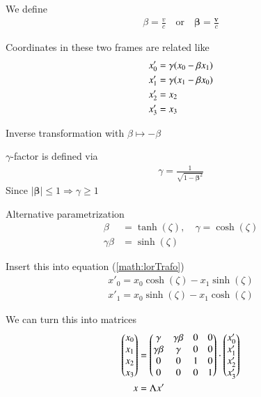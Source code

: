 We define
\begin{align}
   \beta = \frac{v}{c} \quad \text{or} \quad
   \pmb{\beta} = \frac{\pmb{v}}{c}
\end{align}

Coordinates in these two frames are related like
\begin{align*}
   x'_0 &= \gamma(x_0 - \beta x_1) \\
   x'_1 &= \gamma (x_1 - \beta x_0) \notag \\
   x'_2 &= x_2 \notag \\
   x'_3 &= x_3 \notag \label{math:lorTrafo}
\end{align*}

Inverse transformation with $\beta \mapsto -\beta$

$\gamma$-factor is defined via
\begin{align}
   \gamma = \frac{1}{\sqrt{1-\pmb{\beta}^2}}
\end{align}
Since $|\pmb{\beta}| \leq 1 \Rightarrow \gamma \geq 1$

Alternative parametrization
\begin{align*}
   \beta &= \tanh(\zeta), \quad \gamma = \cosh(\zeta) \\
   \gamma \beta &= \sinh(\zeta)
\end{align*}

Insert this into equation (\ref{math:lorTrafo})
\begin{align*}
   x'_0 = x_0 \cosh(\zeta) - x_1 \sinh(\zeta) \\
   x'_1 = x_0 \sinh(\zeta) - x_1 \cosh(\zeta)
\end{align*}

We can turn this into matrices
\begin{align}
   \begin{pmatrix} x_0 \\ x_1 \\ x_2 \\ x_3\end{pmatrix}
   &=
   \begin{pmatrix} \gamma & \gamma\beta & 0 & 0 \\ \gamma\beta & \gamma & 0 & 0 \\ 0 & 0 & 1 & 0 \\ 0 & 0 & 0 & 1\end{pmatrix}
   \cdot
   \begin{pmatrix} x'_0\\ x'_1 \\ x'_2 \\ x'_3\end{pmatrix} \notag \\
   x &= \Lambda x'
\end{align}

